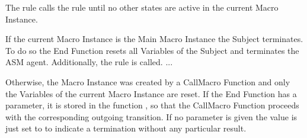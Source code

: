 The  rule calls the  rule
until no other states are active in the current Macro Instance.

If the current Macro Instance is the Main Macro Instance the Subject terminates.
To do so the End Function resets all Variables of the Subject and terminates the
ASM agent.
Additionally, the  rule is called. ... %

Otherwise,  the Macro Instance was created by a CallMacro Function and only the
Variables of the current Macro Instance are reset. If the End Function has a
parameter, it is stored in the function , so
that the CallMacro Function proceeds with the corresponding outgoing transition.
If no parameter is given the value is just set to  to indicate a
termination without any particular result.

